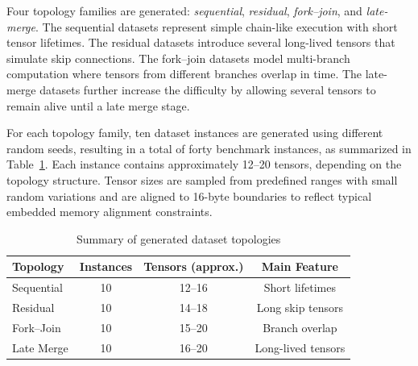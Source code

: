 Four topology families are generated: \textit{sequential}, \textit{residual}, \textit{fork--join}, and \textit{late-merge}. The sequential datasets represent simple chain-like execution with short tensor lifetimes. The residual datasets introduce several long-lived tensors that simulate skip connections. The fork--join datasets model multi-branch computation where tensors from different branches overlap in time. The late-merge datasets further increase the difficulty by allowing several tensors to remain alive until a late merge stage.

For each topology family, ten dataset instances are generated using different random seeds, resulting in a total of forty benchmark instances, as summarized in Table~\ref{tab:dataset}. Each instance contains approximately 12--20 tensors, depending on the topology structure. Tensor sizes are sampled from predefined ranges with small random variations and are aligned to 16-byte boundaries to reflect typical embedded memory alignment constraints.

\begin{table}[t]
\centering
\caption{Summary of generated dataset topologies}
\label{tab:dataset}
\begin{tabular}{lccc}
\hline
Topology & Instances & Tensors (approx.) & Main Feature \\
\hline
Sequential & 10 & 12--16 & Short lifetimes \\
Residual & 10 & 14--18 & Long skip tensors \\
Fork--Join & 10 & 15--20 & Branch overlap \\
Late Merge & 10 & 16--20 & Long-lived tensors \\
\hline
\end{tabular}
\end{table}